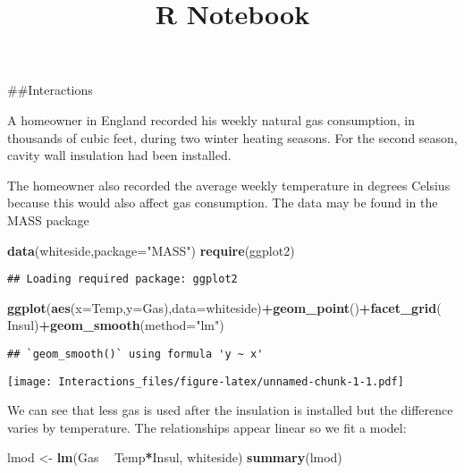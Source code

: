 \documentclass[
]{article}
\title{R Notebook}
\author{}
\date{\vspace{-2.5em}}
\newenvironment{Shaded}{\begin{snugshade}}{\end{snugshade}}
\newcommand{\DataTypeTok}[1]{\textcolor[rgb]{0.13,0.29,0.53}{#1}}
\newcommand{\KeywordTok}[1]{\textcolor[rgb]{0.13,0.29,0.53}{\textbf{#1}}}
\newcommand{\NormalTok}[1]{#1}
\newcommand{\OperatorTok}[1]{\textcolor[rgb]{0.81,0.36,0.00}{\textbf{#1}}}
\newcommand{\StringTok}[1]{\textcolor[rgb]{0.31,0.60,0.02}{#1}}
\begin{document}
\maketitle

\#\#Interactions

A homeowner in England recorded his weekly natural gas consumption, in
thousands of cubic feet, during two winter heating seasons. For the
second season, cavity wall insulation had been installed.

The homeowner also recorded the average weekly temperature in degrees
Celsius because this would also affect gas consumption. The data may be
found in the MASS package

\begin{Shaded}
\begin{Highlighting}[]
\KeywordTok{data}\NormalTok{(whiteside,}\DataTypeTok{package=}\StringTok{"MASS"}\NormalTok{)}
\KeywordTok{require}\NormalTok{(ggplot2)}
\end{Highlighting}
\end{Shaded}

\begin{verbatim}
## Loading required package: ggplot2
\end{verbatim}

\begin{Shaded}
\begin{Highlighting}[]
\KeywordTok{ggplot}\NormalTok{(}\KeywordTok{aes}\NormalTok{(}\DataTypeTok{x=}\NormalTok{Temp,}\DataTypeTok{y=}\NormalTok{Gas),}\DataTypeTok{data=}\NormalTok{whiteside)}\OperatorTok{+}\KeywordTok{geom_point}\NormalTok{()}\OperatorTok{+}\KeywordTok{facet_grid}\NormalTok{(}\OperatorTok{~}\StringTok{ }\NormalTok{Insul)}\OperatorTok{+}\KeywordTok{geom_smooth}\NormalTok{(}\DataTypeTok{method=}\StringTok{"lm"}\NormalTok{)}
\end{Highlighting}
\end{Shaded}

\begin{verbatim}
## `geom_smooth()` using formula 'y ~ x'
\end{verbatim}

\texttt{[image: Interactions\_files/figure-latex/unnamed-chunk-1-1.pdf]}

We can see that less gas is used after the insulation is installed but
the difference varies by temperature. The relationships appear linear so
we fit a model:

\begin{Shaded}
\begin{Highlighting}[]
\NormalTok{lmod <-}\StringTok{ }\KeywordTok{lm}\NormalTok{(Gas }\OperatorTok{~}\StringTok{ }\NormalTok{Temp}\OperatorTok{*}\NormalTok{Insul, whiteside)}
\KeywordTok{summary}\NormalTok{(lmod)}
\end{Highlighting}
\end{Shaded}
\end{document}
